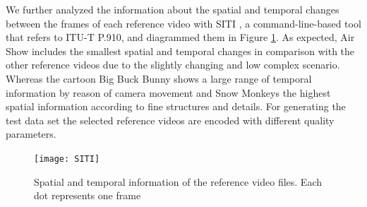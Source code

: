 We further analyzed the information about the spatial and temporal changes between the frames of each reference video with SITI \cite{web:SITI}, a command-line-based tool that refers to ITU-T P.910, and diagrammed them in Figure \ref{fig:SITI}. As expected, Air Show includes the smallest spatial and temporal changes in comparison with the other reference videos due to the slightly changing and low complex scenario. Whereas the cartoon Big Buck Bunny shows a large range of temporal information by reason of camera movement and Snow Monkeys the highest spatial information according to fine structures and details.
For generating the test data set the selected reference videos are encoded with different quality parameters.

\begin{figure}[hbt!]
	\centering
	\texttt{[image: SITI]}
	\caption{Spatial and temporal information of the reference video files. Each dot represents one frame}
	\label{fig:SITI}
\end{figure}
